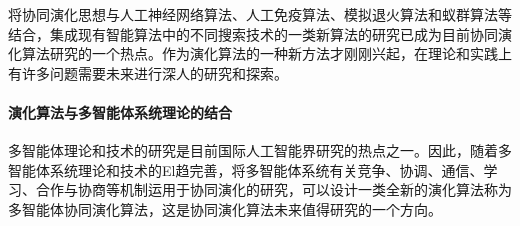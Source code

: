 \documentclass[a4paper]{article}
\begin{document}
    将协同演化思想与人工神经网络算法、人工免疫算法、模拟退火算法和蚁群算法等结合，集成现有智能算法中的不同搜索技术的一类新算法的研究已成为目前协同演化算法研究的一个热点。作为演化算法的一种新方法才刚刚兴起，在理论和实践上有许多问题需要未来进行深人的研究和探索。

    \paragraph{演化算法与多智能体系统理论的结合}
    多智能体理论和技术的研究是目前国际人工智能界研究的热点之一。因此，随着多智能体系统理论和技术的El趋完善，将多智能体系统有关竞争、协调、通信、学习、合作与协商等机制运用于协同演化的研究，可以设计一类全新的演化算法称为多智能体协同演化算法，这是协同演化算法未来值得研究的一个方向。



    \newpage
    
    
\end{document}
